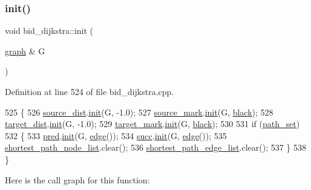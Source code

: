 \subsubsection{\texorpdfstring{init()}{init()}}
{\footnotesize\ttfamily void bid\+\_\+dijkstra\+::init (\begin{DoxyParamCaption}\item[{\mbox{\hyperlink{classgraph}{graph}} \&}]{G }\end{DoxyParamCaption})\hspace{0.3cm}{\ttfamily [private]}}



Definition at line 524 of file bid\+\_\+dijkstra.\+cpp.


\begin{DoxyCode}
525 \{
526     \mbox{\hyperlink{classbid__dijkstra_a19dc6c350617f0fa5769e5c70781d658}{source\_dist}}.\mbox{\hyperlink{classne__map_a4ef2ab4aebcb57a7a101975bf6a88e24}{init}}(G, -1.0);
527     \mbox{\hyperlink{classbid__dijkstra_a1b3684b69db38c8eaf9d4fbb056bc392}{source\_mark}}.\mbox{\hyperlink{classne__map_a4ef2ab4aebcb57a7a101975bf6a88e24}{init}}(G, \mbox{\hyperlink{classbid__dijkstra_a8b7dcccc9fab2ec5edc8da01029c09d5acc2693da1b850fc6c7e79aef42fae336}{black}});
528     \mbox{\hyperlink{classbid__dijkstra_a7a46fe8fe075d798eaca14b37aa15c0d}{target\_dist}}.\mbox{\hyperlink{classne__map_a4ef2ab4aebcb57a7a101975bf6a88e24}{init}}(G, -1.0);
529     \mbox{\hyperlink{classbid__dijkstra_a72bc13758ebe2f752cd15f018c5ba64e}{target\_mark}}.\mbox{\hyperlink{classne__map_a4ef2ab4aebcb57a7a101975bf6a88e24}{init}}(G, \mbox{\hyperlink{classbid__dijkstra_a8b7dcccc9fab2ec5edc8da01029c09d5acc2693da1b850fc6c7e79aef42fae336}{black}});
530     
531     \textcolor{keywordflow}{if} (\mbox{\hyperlink{classbid__dijkstra_aa7b329f69600fffae2753f87501dab9d}{path\_set}})
532     \{
533     \mbox{\hyperlink{classbid__dijkstra_a930f24f8d17953eccfa0e8765587b0ea}{pred}}.\mbox{\hyperlink{classne__map_a4ef2ab4aebcb57a7a101975bf6a88e24}{init}}(G, \mbox{\hyperlink{classedge}{edge}}());
534     \mbox{\hyperlink{classbid__dijkstra_a7379d185faf9af3820b8292676f9d88a}{succ}}.\mbox{\hyperlink{classne__map_a4ef2ab4aebcb57a7a101975bf6a88e24}{init}}(G, \mbox{\hyperlink{classedge}{edge}}());
535     \mbox{\hyperlink{classbid__dijkstra_a70041b0a90fb840e141126fe7a6119db}{shortest\_path\_node\_list}}.clear();
536     \mbox{\hyperlink{classbid__dijkstra_a4b7bdbc4d016748b40ca925cf1e6f778}{shortest\_path\_edge\_list}}.clear();
537     \}
538 \}
\end{DoxyCode}
Here is the call graph for this function\+:\nopagebreak
